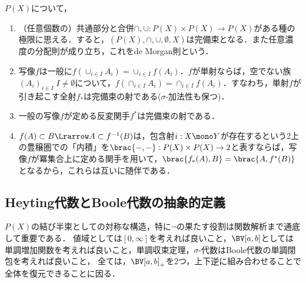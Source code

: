 \documentclass[uplatex, dvipdfmx]{jsreport}
\begin{document}
\begin{example}
    $P(X)$について，
    \begin{enumerate}
        \item （任意個数の）共通部分と合併$\cap,\cup:P(X)\times P(X)\to P(X)$がある種の極限に思える．すると，$(P(X),\cap,\cup,\emptyset,X)$は完備束となる．また任意濃度の分配則が成り立ち，これをde Morgan則という．
        \item 写像$f$は一般に$f(\cup_{i\in I}A_i)=\cup_{i\in I}f(A_i)$．$f$が単射ならば，空でない族$(A_i)_{i\in I}\;I\ne\emptyset$について，$f(\cap_{i\in I}A_i)=\cap_{i\in I}f(A_i)$．すなわち，単射$f$が引き起こす全射$f_*$は完備束の射である($\sigma$-加法性も保つ)．
        \item 一般の写像$f$が定める反変関手$f^*$は完備束の射である．
        \item $f(A)\subset B\Lrarrow A\subset f^{-1}(B)$は，包含射$i:X\mono Y$が存在するという2上の豊穣圏での「内積」を$\brac{-,-}:P(X)\times P(X)\to 2$と表すならば，写像$f$が冪集合上に定める関手を用いて，$\brac{f_*(A),B}=\brac{A,f^*(B)}$となるから，これらは互いに随伴である．
    \end{enumerate}
\end{example}

\subsection{Heyting代数とBoole代数の抽象的定義}

\begin{tcolorbox}[colframe=ForestGreen, colback=ForestGreen!10!white,breakable,colbacktitle=ForestGreen!40!white,coltitle=black,fonttitle=\bfseries\sffamily,
    title=解析学で最も大事な構造：Boole代数]
    $P(X)$の結び半束としての対称な構造，特に$\lnot$の果たす役割は関数解析まで通底して重要である．
    値域としては$[0,\infty]$を考えれば良いこと，$\BV[a,b]$としては単調増加関数を考えれば良いこと，単調収束定理，$\sigma$-代数はBoole代数の単調閉包を考えれば良いこと，
    全ては，$\BV[a,b]_+$を2つ，上下逆に組み合わせることで全体を復元できることに因る．
\end{tcolorbox}
\end{document}
